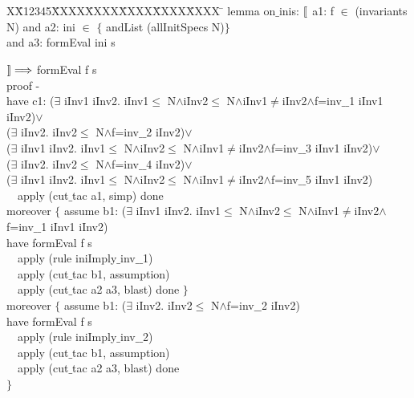 \documentclass{llncs}
\newlength{\fminilength}
\newenvironment{fmini}[1][\linewidth]
  {\setlength{\fminilength}{#1\fboxsep-2\fboxrule}%
   \vspace{2ex}\noindent\begin{lrbox}{\fminibox}\begin{minipage}{\fminilength}%
   \mbox{ }\hfill\vspace{-2.5ex}}%
  {\end{minipage}\end{lrbox}\vspace{1ex}\hspace{0ex}%
   \framebox{\usebox{\fminibox}}}
\newenvironment{specification}
{\noindent\scriptsize
\tt\begin{fmini}\begin{tabbing}X\=X12345\=XXXX\=XXXX\=XXXX\=XXXX\=XXXX
\=\+\kill} {\end{tabbing}\normalfont\end{fmini}}
\def \twoSpaces {\ \ }
\def \iInv {iInv}
\begin{document}
\begin{specification}
lemma on$\_$inis:
  $\emph{$\mathopen{\lbrack\mkern-3mu\lbrack}$}$ a1:
f $\in$ (invariants N)
 and a2:
ini $\in$ $\{$
andList (allInitSpecs N)$\}$\\

 and a3:
formEval ini s

  $\emph{$\mathclose{\rbrack\mkern-3mu\rbrack}$}\Longrightarrow$
formEval f s\\

  proof -\\
  have c1:
($\exists$ \iInv1 \iInv2. \iInv1$\le$
N$\wedge$\iInv2$\le$
N$\wedge$\iInv1$\neq$\iInv2$\wedge$f=inv$\_$$\_$1  \iInv1 \iInv2)$\vee$\\
    ($\exists$ \iInv2. \iInv2$\le$
N$\wedge$f=inv$\_$$\_$2  \iInv2)$\vee$\\
    ($\exists$ \iInv1 \iInv2. \iInv1$\le$
N$\wedge$\iInv2$\le$
N$\wedge$\iInv1$\neq$\iInv2$\wedge$f=inv$\_$$\_$3  \iInv1 \iInv2)$\vee$\\
    ($\exists$ \iInv2. \iInv2$\le$
N$\wedge$f=inv$\_$$\_$4  \iInv2)$\vee$\\
    ($\exists$ \iInv1 \iInv2. \iInv1$\le$
N$\wedge$\iInv2$\le$
N$\wedge$\iInv1$\neq$\iInv2$\wedge$f=inv$\_$$\_$5  \iInv1 \iInv2)\\

\twoSpaces  apply (cut$\_$tac a1, simp) done\\
    moreover $\{$
      assume b1:
($\exists$ \iInv1 \iInv2. \iInv1$\le$
N$\wedge$\iInv2$\le$
N$\wedge$\iInv1$\neq$\iInv2$\wedge$f=inv$\_$$\_$1  \iInv1 \iInv2)\\

      have
formEval f s\\

\twoSpaces      apply (rule iniImply$\_$inv$\_$$\_$1)\\
\twoSpaces      apply (cut$\_$tac b1, assumption)\\
\twoSpaces      apply (cut$\_$tac a2 a3, blast) done
    $\}$\\


    moreover $\{$
      assume b1:
($\exists$ \iInv2. \iInv2$\le$
N$\wedge$f=inv$\_$$\_$2  \iInv2)\\

      have
formEval f s\\

\twoSpaces      apply (rule iniImply$\_$inv$\_$$\_$2)\\
\twoSpaces      apply (cut$\_$tac b1, assumption)\\
\twoSpaces      apply (cut$\_$tac a2 a3, blast) done\\
    $\}$\\



\end{specification}
\end{document}
